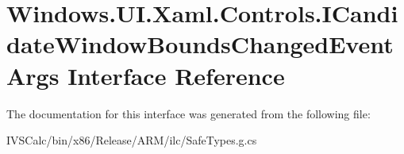 \hypertarget{interface_windows_1_1_u_i_1_1_xaml_1_1_controls_1_1_i_candidate_window_bounds_changed_event_args}{}\section{Windows.\+U\+I.\+Xaml.\+Controls.\+I\+Candidate\+Window\+Bounds\+Changed\+Event\+Args Interface Reference}
\label{interface_windows_1_1_u_i_1_1_xaml_1_1_controls_1_1_i_candidate_window_bounds_changed_event_args}


The documentation for this interface was generated from the following file\+:\begin{DoxyCompactItemize}
\item 
I\+V\+S\+Calc/bin/x86/\+Release/\+A\+R\+M/ilc/Safe\+Types.\+g.\+cs\end{DoxyCompactItemize}
